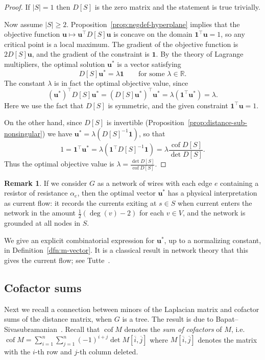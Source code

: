 \documentclass{amsart}
\theoremstyle{definition}
\newtheorem{rmk}[thm]{Remark}
\newcommand{\RR}{\mathbb{R}}
\newcommand{\bone}{\mathbf{1}}
\newcommand{\boldm}{\mathbf{m}}
\newcommand{\boldu}{\mathbf{u}}
\newcommand{\tr}{\intercal}
\DeclareMathOperator{\cof}{cof}
\begin{document}
\begin{proof}
If $|S| = 1$ then $D[S]$ is the zero matrix and the statement is true trivially.

Now assume $|S| \geq 2$.
Proposition~\ref{prop:negdef-hyperplane} implies that 
the objective function $\boldu \mapsto \boldu^\tr D[S]\boldu$ is concave on the domain $\bone^\tr \boldu = 1$,
so any critical point is a local maximum.
The gradient of the objective function is $2 D[S] \boldu$, 
and the gradient of the constraint is $\bone$.
By the theory of Lagrange multipliers, the optimal solution $\boldu^*$ is a vector satisfying
\[
	D[S] \boldu^* = \lambda \bone \qquad\text{for some }\lambda \in \RR.
\]
The constant $\lambda$ is in fact the optimal objective value, since
\[
	(\boldu^*)^\tr D[S] \boldu^* = (D[S] \boldu^*)^\tr \boldu^* = \lambda (\bone^\tr \boldu^*) = \lambda.
\]
Here we use the fact that $D[S]$ is symmetric, and the given constraint $\bone^\tr \boldu = 1$.

On the other hand,
since $D[S]$ is invertible (Proposition~\ref{prop:distance-sub-nonsingular}) we have $ \boldu^* = \lambda (D[S]^{-1} \bone) $, so that
\[
	1 = \bone^\tr \boldu^* = \lambda (\bone^\tr D[S]^{-1} \bone)
	= \lambda \frac{\cof D[S]}{\det D[S]}.
\]
Thus the optimal objective value is
$\displaystyle
	\lambda = \frac{\det D[S]}{\cof D[S]} .
$
\end{proof}

\begin{rmk}
If we consider $G$ as a network of wires with each edge $e$ containing a resistor of resistance $\alpha_e$,
then the optimal vector $\boldu^*$
has a physical interpretation as current flow: 
it records the currents exiting at $s \in S$
when current enters the network in the amount $\frac{1}{2}(\deg(v) - 2)$
for each $v \in V$,
and the network is grounded at all nodes in $S$.

We give an explicit combinatorial expression for $\boldu^*$, up to a normalizing constant, in Definition~\ref{dfn:m-vector}.
It is a classical result in network theory that this gives the current flow; see Tutte~\cite[Section VI.6]{tutte}.
\end{rmk}

\subsection{Cofactor sums}

Next we recall a connection between minors of the Laplacian matrix and cofactor sums of the distance matrix, when $G$ is a tree.
The result is due to Bapat--Sivasubramanian~\cite{bapat-sivasubramanian}.
Recall that $\cof M$ denotes the {\em sum of cofactors} of $M$, i.e. 
$\displaystyle
	\cof M = \sum_{i = 1}^{n} \sum_{j = 1}^{n} (-1)^{i + j} \det M[\overline{i}, \overline{j}]
$
where $M[\overline{i}, \overline{j}]$ denotes the matrix with the $i$-th row and $j$-th column deleted.
\end{document}

